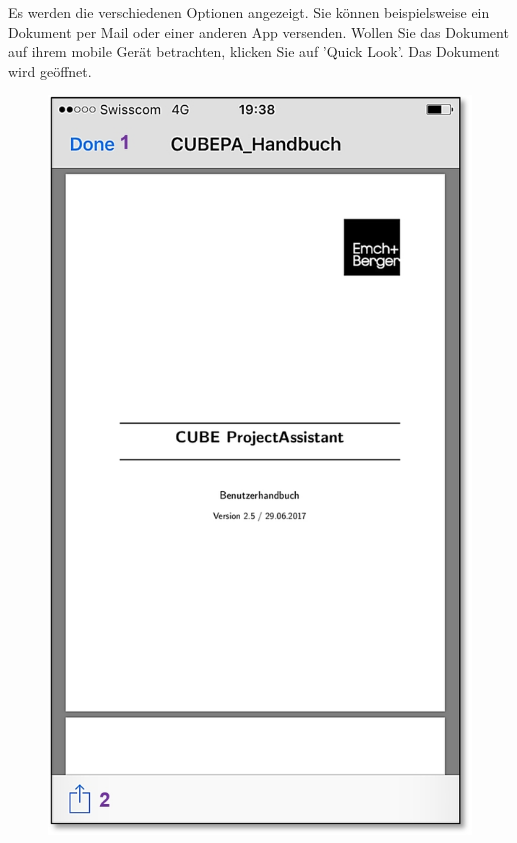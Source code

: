 Es werden die verschiedenen Optionen angezeigt. Sie können beispielsweise ein Dokument per Mail oder einer anderen App versenden. Wollen Sie das Dokument auf ihrem mobile Gerät betrachten, klicken Sie auf 'Quick Look'. Das Dokument wird geöffnet.

\vspace{8cm}

\begin{figure}   %
  \vspace{-35pt}      %
  \begin{center}
    \includegraphics[width=1\linewidth]{../chapters/11_Dokumentenablage/pictures/11-mob07_Dokument_lesen_teilen.jpg}
  \end{center}
  \vspace{-20pt}
  \vspace{-10pt}
\end{figure}

